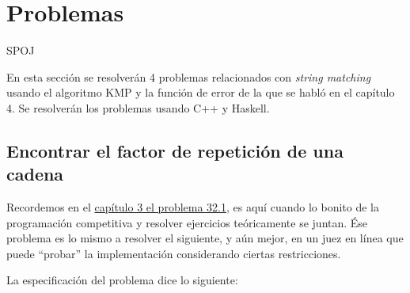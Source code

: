 

\section{Problemas}

{\selectfont SPOJ}

En esta sección se resolverán 4 problemas relacionados con \textit{string matching} usando el
algoritmo KMP y la función de error de la que se habló en el capítulo 4. Se resolverán los
problemas usando C++ y Haskell.

\subsection{Encontrar el factor de repetición de una cadena}
Recordemos en el \hyperlink{repetition_factor}{capítulo 3 el problema 32.1}, es aquí cuando lo
bonito de la programación competitiva y resolver ejercicios teóricamente se juntan. Ése problema
es lo mismo a resolver el siguiente, y aún mejor, en un juez en línea que puede ``probar'' la
implementación considerando ciertas restricciones.

La especificación del problema dice lo siguiente: 



